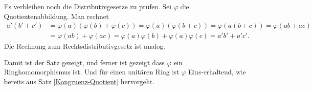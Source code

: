 Es verbleiben noch die Distributivgesetze zu prüfen.
Sei $\varphi$ die Quotientenabbildung. Man rechnet
\begin{align*}
a'(b'+c') &= \varphi(a)(\varphi(b)+\varphi(c)) = \varphi(a)(\varphi(b+c))
= \varphi(a(b+c)) = \varphi(ab+ac)\\
&= \varphi(ab)+\varphi(ac) = \varphi(a)\varphi(b)+\varphi(a)\varphi(c)
= a'b'+a'c'.
\end{align*}
Die Rechnung zum Rechtsdistributivgesetz ist analog.

Damit ist der Satz gezeigt, und ferner ist gezeigt dass $\varphi$ ein
Ringhomomorphismus ist. Und für einen unitären Ring ist $\varphi$
Eins-erhaltend, wie bereits aus Satz \ref{Kongruenz-Quotient}
hervorgeht.\,\qedsymbol

